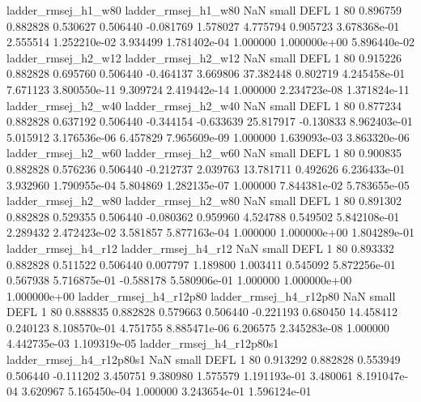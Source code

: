      ladder_rmsej_h1_w80      ladder_rmsej_h1_w80                   NaN      small     DEFL                 1 80 0.896759       0.882828 0.530627       0.506440   -0.081769      1.578027      4.775794     0.905723   3.678368e-01  2.555514 1.252210e-02     3.934499   1.781402e-04            1.000000    1.000000e+00        5.896440e-02
     ladder_rmsej_h2_w12      ladder_rmsej_h2_w12                   NaN      small     DEFL                 1 80 0.915226       0.882828 0.695760       0.506440   -0.464137      3.669806     37.382448     0.802719   4.245458e-01  7.671123 3.800550e-11     9.309724   2.419442e-14            1.000000    2.234723e-08        1.371824e-11
     ladder_rmsej_h2_w40      ladder_rmsej_h2_w40                   NaN      small     DEFL                 1 80 0.877234       0.882828 0.637192       0.506440   -0.344154     -0.633639     25.817917    -0.130833   8.962403e-01  5.015912 3.176536e-06     6.457829   7.965609e-09            1.000000    1.639093e-03        3.863320e-06
     ladder_rmsej_h2_w60      ladder_rmsej_h2_w60                   NaN      small     DEFL                 1 80 0.900835       0.882828 0.576236       0.506440   -0.212737      2.039763     13.781711     0.492626   6.236433e-01  3.932960 1.790955e-04     5.804869   1.282135e-07            1.000000    7.844381e-02        5.783655e-05
     ladder_rmsej_h2_w80      ladder_rmsej_h2_w80                   NaN      small     DEFL                 1 80 0.891302       0.882828 0.529355       0.506440   -0.080362      0.959960      4.524788     0.549502   5.842108e-01  2.289432 2.472423e-02     3.581857   5.877163e-04            1.000000    1.000000e+00        1.804289e-01
     ladder_rmsej_h4_r12      ladder_rmsej_h4_r12                   NaN      small     DEFL                 1 80 0.893332       0.882828 0.511522       0.506440    0.007797      1.189800      1.003411     0.545092   5.872256e-01  0.567938 5.716875e-01    -0.588178   5.580906e-01            1.000000    1.000000e+00        1.000000e+00
  ladder_rmsej_h4_r12p80   ladder_rmsej_h4_r12p80                   NaN      small     DEFL                 1 80 0.888835       0.882828 0.579663       0.506440   -0.221193      0.680450     14.458412     0.240123   8.108570e-01  4.751755 8.885471e-06     6.206575   2.345283e-08            1.000000    4.442735e-03        1.109319e-05
ladder_rmsej_h4_r12p80s1 ladder_rmsej_h4_r12p80s1                   NaN      small     DEFL                 1 80 0.913292       0.882828 0.553949       0.506440   -0.111202      3.450751      9.380980     1.575579   1.191193e-01  3.480061 8.191047e-04     3.620967   5.165450e-04            1.000000    3.243654e-01        1.596124e-01
